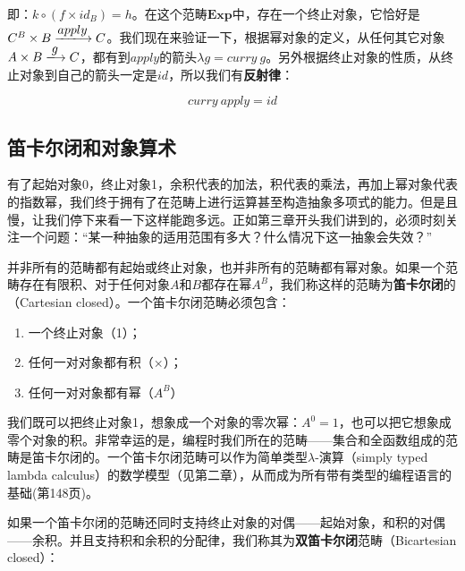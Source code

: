 \documentclass{article}
\begin{document}
即：$k \circ (f \times id_B) = h$。在这个范畴$\pmb{Exp}$中，存在一个终止对象，它恰好是$C^B \times B \arrowto{apply} C$。我们现在来验证一下，根据幂对象的定义，从任何其它对象$A \times B \arrowto{g} C$，都有到$apply$的箭头$\lambda g = curry\ g$。另外根据终止对象的性质，从终止对象到自己的箭头一定是$id$，所以我们有\textbf{反射律}：

\[
curry\ apply = id
\]

\begin{Exercise}
\end{Exercise}

\subsection{笛卡尔闭和对象算术}

有了起始对象0，终止对象1，余积代表的加法，积代表的乘法，再加上幂对象代表的指数幂，我们终于拥有了在范畴上进行运算甚至构造抽象多项式的能力。但是且慢，让我们停下来看一下这样能跑多远。正如第三章开头我们讲到的，必须时刻关注一个问题：“某一种抽象的适用范围有多大？什么情况下这一抽象会失效？”

并非所有的范畴都有起始或终止对象，也并非所有的范畴都有幂对象。如果一个范畴存在有限积、对于任何对象$A$和$B$都存在幂$A^B$，我们称这样的范畴为\textbf{笛卡尔闭}的（Cartesian closed）。一个笛卡尔闭范畴必须包含：

\begin{enumerate}
\item 一个终止对象（1）；
\item 任何一对对象都有积（$\times$）；
\item 任何一对对象都有幂（$A^B$）
\end{enumerate}

我们既可以把终止对象1，想象成一个对象的零次幂：$A^0 = 1$，也可以把它想象成零个对象的积。非常幸运的是，编程时我们所在的范畴——集合和全函数组成的范畴是笛卡尔闭的。一个笛卡尔闭范畴可以作为简单类型$\lambda$-演算（simply typed lambda calculus）的数学模型（见第二章），从而成为所有带有类型的编程语言的基础(\cite{Milewski2018}第148页)。

如果一个笛卡尔闭的范畴还同时支持终止对象的对偶——起始对象，和积的对偶——余积。并且支持积和余积的分配律，我们称其为\textbf{双笛卡尔闭}范畴（Bicartesian closed）：
\end{document}
